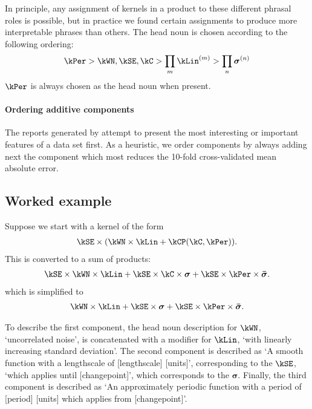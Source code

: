 In principle, any assignment of kernels in a product to these different phrasal roles is possible, but in practice we found certain assignments to produce more interpretable phrases than others.
The head noun is chosen according to the following ordering:
\begin{align*}
\kPer > \kWN, \kSE, \kC > \prod_m \kLin^{(m)} > \prod_n \boldsymbol\sigma^{(n)}
\end{align*}
\ie $\kPer$ is always chosen as the head noun when present.

\paragraph{Ordering additive components}

The reports generated by \procedurename{} attempt to present the most interesting or important features of a data set first.
As a heuristic, we order components by always adding next the component which most reduces the 10-fold cross-validated mean absolute error.



\subsection{Worked example}

Suppose we start with a kernel of the form
\begin{align*}
\kSE \times (\kWN \times \kLin + \kCP(\kC, \kPer)).
\end{align*}
This is converted to a sum of products:
\begin{align*}
\kSE \times \kWN \times \kLin + \kSE \times \kC \times \boldsymbol{\sigma} + \kSE \times \kPer \times \boldsymbol{\bar\sigma}.
\end{align*}
which is simplified to
\begin{align*}
\kWN \times \kLin + \kSE \times \boldsymbol{\sigma} + \kSE \times \kPer \times \boldsymbol{\bar\sigma}.
\end{align*}

To describe the first component, the head noun description for $\kWN$, `uncorrelated noise', is concatenated with a modifier for $\kLin$, `with linearly increasing standard deviation'.
%
The second component is described as `A smooth function with a lengthscale of [lengthscale] [units]', corresponding to the $\kSE$, `which applies until [changepoint]', which corresponds to the $\boldsymbol{\sigma}$.
%
Finally, the third component is described as `An approximately periodic function with a period of [period] [units] which applies from [changepoint]'.

